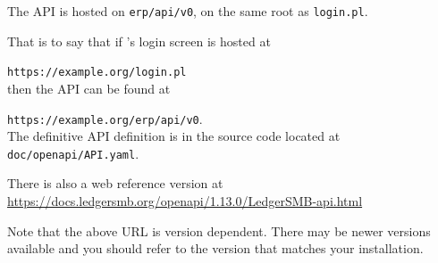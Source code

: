 The API is hosted on \texttt{erp/api/v0}, on the same root as \texttt{login.pl}. 

That is to say that if \lsmb's login screen is hosted at

\texttt{https://example.org/login.pl} \\

then the API can be found at

\texttt{https://example.org/erp/api/v0}.  \\

The definitive API definition is in the source code located at
\texttt{doc/openapi/API.yaml}.

There is also a web reference version at \\
\url{https://docs.ledgersmb.org/openapi/1.13.0/LedgerSMB-api.html}

Note that the above URL is \lsmbsp version dependent. There may be newer versions available and
you should refer to the version that matches your installation.
